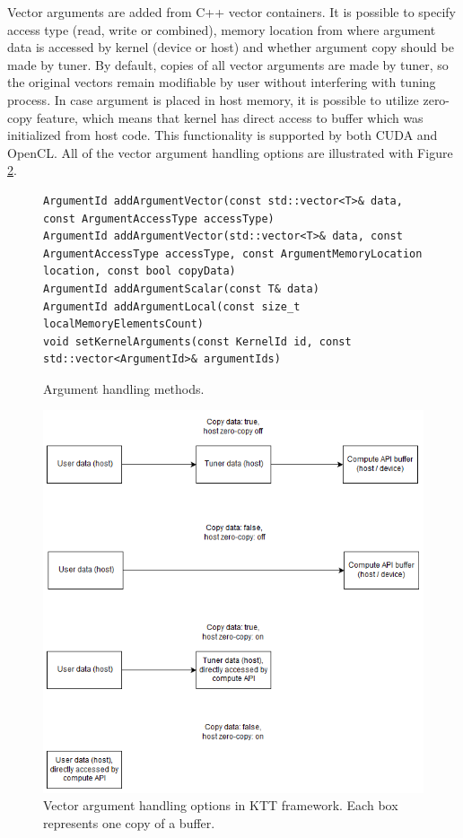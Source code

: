 \documentclass
[
    digital, %
    oneside, %
    table, %
    nolof, %
    nolot, %
    nocover %
]{fithesis3}
\begin{document}
Vector arguments are added from C++ vector containers. It is possible to specify access type (read, write or combined), memory location from where
argument data is accessed by kernel (device or host) and whether argument copy should be made by tuner. By default, copies of all vector arguments
are made by tuner, so the original vectors remain modifiable by user without interfering with tuning process. In case argument is placed in host
memory, it is possible to utilize zero-copy feature, which means that kernel has direct access to buffer which was initialized from host code. This
functionality is supported by both CUDA and OpenCL. All of the vector argument handling options are illustrated with Figure \ref{ktt-buffer-diagram}.

\begin{figure}
\begin{adjustwidth}{-1cm}{-1cm}
\begin{lstlisting}
ArgumentId addArgumentVector(const std::vector<T>& data, const ArgumentAccessType accessType)
ArgumentId addArgumentVector(std::vector<T>& data, const ArgumentAccessType accessType, const ArgumentMemoryLocation location, const bool copyData)
ArgumentId addArgumentScalar(const T& data)
ArgumentId addArgumentLocal(const size_t localMemoryElementsCount)
void setKernelArguments(const KernelId id, const std::vector<ArgumentId>& argumentIds)
\end{lstlisting}
\caption{Argument handling methods.}
\label{ktt-argument-methods}
\end{adjustwidth}
\end{figure}

\begin{figure}
\begin{center}
\includegraphics[width=125mm]{resources/ktt_buffer_diagram.png}
\end{center}
\caption{Vector argument handling options in KTT framework. Each box represents one copy of a buffer.}
\label{ktt-buffer-diagram}
\end{figure}
\end{document}
